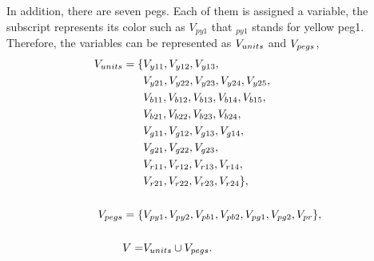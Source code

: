 In addition, there are seven pegs. Each of them is assigned a variable, the subscript represents its color such as $V_{py1}$ that $_{py1}$ stands for yellow peg1. Therefore, the variables can be represented as $V_{units}$ and $V_{pegs}$,
\begin{equation}
\begin{aligned}
V_{units}=\{&V_{y11},V_{y12},V_{y13},\\&V_{y21},V_{y22},V_{y23},V_{y24},V_{y25},\\&V_{b11},V_{b12},V_{b13},V_{b14},
V_{b15},\\&V_{b21},V_{b22},V_{b23},V_{b24},\\&V_{g11},V_{g12},V_{g13},V_{g14},\\&V_{g21},V_{g22},V_{g23},\\&V_{r11},
V_{r12},V_{r13},V_{r14},\\&V_{r21},V_{r22},V_{r23},V_{r24}\},\\
\\V_{pegs} = \{&V_{py1}, V_{py2}, V_{pb1}, V_{pb2}, V_{pg1}, V_{pg2}, V_{pr}\},\\
\\V = &V_{units} \cup V_{pegs}.
\end{aligned}
\end{equation}
